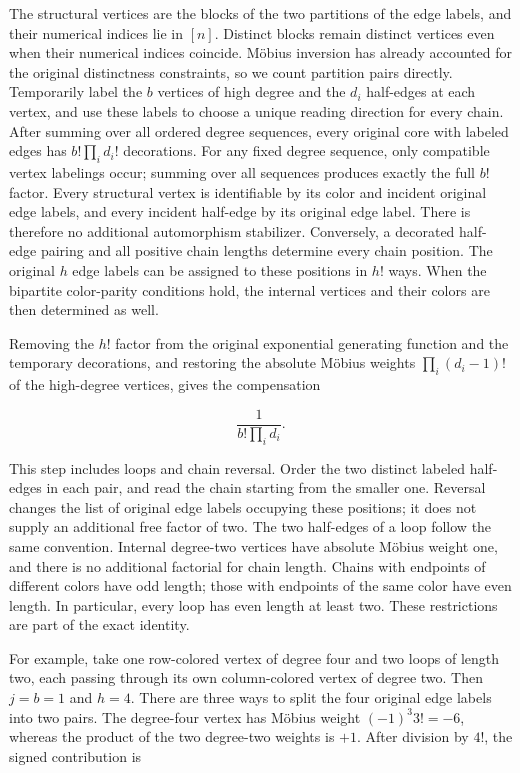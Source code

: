 \documentclass[11pt,a4paper]{article}
\begin{document}
The structural vertices are the blocks of the two partitions of the edge labels, and their numerical indices lie in \([n]\). Distinct blocks remain distinct vertices even when their numerical indices coincide. Möbius inversion has already accounted for the original distinctness constraints, so we count partition pairs directly. Temporarily label the \(b\) vertices of high degree and the \(d_i\) half-edges at each vertex, and use these labels to choose a unique reading direction for every chain. After summing over all ordered degree sequences, every original core with labeled edges has \(b!\prod_i d_i!\) decorations. For any fixed degree sequence, only compatible vertex labelings occur; summing over all sequences produces exactly the full \(b!\) factor. Every structural vertex is identifiable by its color and incident original edge labels, and every incident half-edge by its original edge label. There is therefore no additional automorphism stabilizer. Conversely, a decorated half-edge pairing and all positive chain lengths determine every chain position. The original \(h\) edge labels can be assigned to these positions in \(h!\) ways. When the bipartite color-parity conditions hold, the internal vertices and their colors are then determined as well.

Removing the \(h!\) factor from the original exponential generating function and the temporary decorations, and restoring the absolute Möbius weights \(\prod_i(d_i-1)!\) of the high-degree vertices, gives the compensation

\[
\frac1{b!\prod_i d_i}.
\]

This step includes loops and chain reversal. Order the two distinct labeled half-edges in each pair, and read the chain starting from the smaller one. Reversal changes the list of original edge labels occupying these positions; it does not supply an additional free factor of two. The two half-edges of a loop follow the same convention. Internal degree-two vertices have absolute Möbius weight one, and there is no additional factorial for chain length. Chains with endpoints of different colors have odd length; those with endpoints of the same color have even length. In particular, every loop has even length at least two. These restrictions are part of the exact identity.

For example, take one row-colored vertex of degree four and two loops of length two, each passing through its own column-colored vertex of degree two. Then \(j=b=1\) and \(h=4\). There are three ways to split the four original edge labels into two pairs. The degree-four vertex has Möbius weight \((-1)^3 3!=-6\), whereas the product of the two degree-two weights is \(+1\). After division by \(4!\), the signed contribution is
\end{document}
